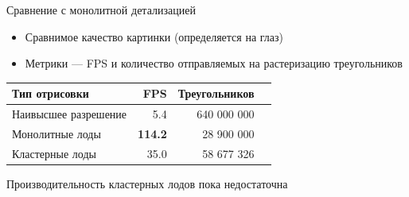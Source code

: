 \begin{frame}{Сравнение с монолитной детализацией}
    \begin{itemize}
        \item Сравнимое качество картинки (определяется на глаз)
        \item Метрики --- FPS и количество отправляемых на растеризацию треугольников
    \end{itemize}

    \begin{center}
        \begin{tabular}{lrrr}
            \hline \hline
            Тип отрисовки & FPS & Треугольников \\ \hline
            Наивысшее разрешение & 5.4 & 640 000 000 \\
            Монолитные лоды & \textbf{114.2} & 28 900 000 \\
            Кластерные лоды & 35.0 & 58 677 326 \\
            \hline \hline
        \end{tabular}
    \end{center}

    \alert{Производительность кластерных лодов пока недостаточна}
\end{frame}


